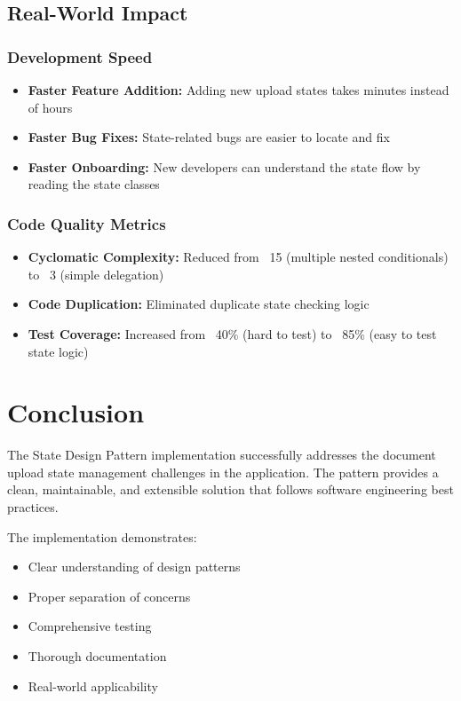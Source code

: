 \documentclass[11pt,a4paper]{article}
\begin{document}
\subsection{Real-World Impact}

\subsubsection{Development Speed}

\begin{itemize}
    \item \textbf{Faster Feature Addition:} Adding new upload states takes minutes instead of hours
    \item \textbf{Faster Bug Fixes:} State-related bugs are easier to locate and fix
    \item \textbf{Faster Onboarding:} New developers can understand the state flow by reading the state classes
\end{itemize}

\subsubsection{Code Quality Metrics}

\begin{itemize}
    \item \textbf{Cyclomatic Complexity:} Reduced from ~15 (multiple nested conditionals) to ~3 (simple delegation)
    \item \textbf{Code Duplication:} Eliminated duplicate state checking logic
    \item \textbf{Test Coverage:} Increased from ~40\% (hard to test) to ~85\% (easy to test state logic)
\end{itemize}

\section{Conclusion}

The State Design Pattern implementation successfully addresses the document upload state management challenges in the application. The pattern provides a clean, maintainable, and extensible solution that follows software engineering best practices.

The implementation demonstrates:
\begin{itemize}
    \item Clear understanding of design patterns
    \item Proper separation of concerns
    \item Comprehensive testing
    \item Thorough documentation
    \item Real-world applicability
\end{itemize}
\end{document}
